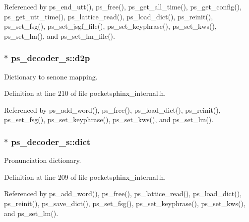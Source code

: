 Referenced by ps\-\_\-end\-\_\-utt(), ps\-\_\-free(), ps\-\_\-get\-\_\-all\-\_\-time(), ps\-\_\-get\-\_\-config(), ps\-\_\-get\-\_\-utt\-\_\-time(), ps\-\_\-lattice\-\_\-read(), ps\-\_\-load\-\_\-dict(), ps\-\_\-reinit(), ps\-\_\-set\-\_\-fsg(), ps\-\_\-set\-\_\-jsgf\-\_\-file(), ps\-\_\-set\-\_\-keyphrase(), ps\-\_\-set\-\_\-kws(), ps\-\_\-set\-\_\-lm(), and ps\-\_\-set\-\_\-lm\-\_\-file().

\subsubsection[{d2p}]{$\ast$ ps\-\_\-decoder\-\_\-s\-::d2p}\label{structps__decoder__s_ae6515cbc261686f3f3bbd95719f79793}


Dictionary to senone mapping. 



Definition at line 210 of file pocketsphinx\-\_\-internal.\-h.



Referenced by ps\-\_\-add\-\_\-word(), ps\-\_\-free(), ps\-\_\-load\-\_\-dict(), ps\-\_\-reinit(), ps\-\_\-set\-\_\-fsg(), ps\-\_\-set\-\_\-keyphrase(), ps\-\_\-set\-\_\-kws(), and ps\-\_\-set\-\_\-lm().

\subsubsection[{dict}]{$\ast$ ps\-\_\-decoder\-\_\-s\-::dict}\label{structps__decoder__s_aef6228c17907cc1d0cef835b238b5d91}


Pronunciation dictionary. 



Definition at line 209 of file pocketsphinx\-\_\-internal.\-h.



Referenced by ps\-\_\-add\-\_\-word(), ps\-\_\-free(), ps\-\_\-lattice\-\_\-read(), ps\-\_\-load\-\_\-dict(), ps\-\_\-reinit(), ps\-\_\-save\-\_\-dict(), ps\-\_\-set\-\_\-fsg(), ps\-\_\-set\-\_\-keyphrase(), ps\-\_\-set\-\_\-kws(), and ps\-\_\-set\-\_\-lm().

